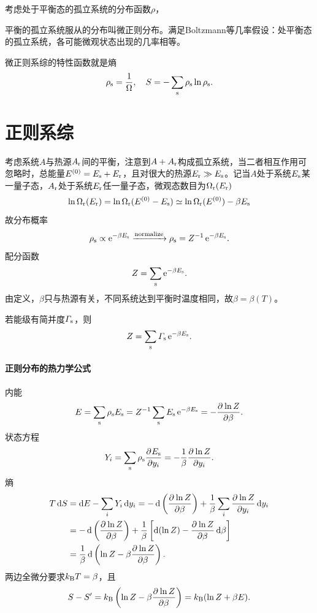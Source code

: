 考虑处于平衡态的孤立系统的分布函数$\rho$，

平衡的孤立系统服从的分布叫微正则分布。满足Boltzmann等几率假设：处平衡态的孤立系统，各可能微观状态出现的几率相等。

微正则系综的特性函数就是熵
\[
	\rho_\mathrm s=\frac1\Omega,\quad S=-\sum_\mathrm s\rho_\mathrm s\ln\rho_\mathrm s.
\]

\section{正则系综}

考虑系统$A$与热源$A_\mathrm r$间的平衡，注意到$A+A_\mathrm r$构成孤立系统，当二者相互作用可忽略时，总能量$E^{(0)}=E_\mathrm s+E_\mathrm r$，且对很大的热源$E_\mathrm r\gg E_\mathrm s$。记当$A$处于系统$E_\mathrm s$某一量子态，$A_\mathrm r$处于系统$E_\mathrm r$任一量子态，微观态数目为$\Omega_\mathrm r(E_\mathrm r)$
\[
	\ln\Omega_\mathrm r(E_\mathrm r)=\ln\Omega_\mathrm r(E^{(0)}-E_\mathrm s)\simeq\ln\Omega_\mathrm r(E^{(0)})-\beta E_\mathrm s
\]
故分布概率
\[
	\rho_\mathrm s\propto\mathop{}\!\mathrm{e}^{-\beta E_\mathrm s}\xrightarrow{\text{normalize}}\rho_\mathrm s=Z^{-1}\mathop{}\!\mathrm{e}^{-\beta E_\mathrm s}.
\]
配分函数
\[
	Z=\sum_\mathrm s\mathop{}\!\mathrm{e}^{-\beta E_\mathrm s}.
\]
由定义，$\beta$只与热源有关，不同系统达到平衡时温度相同，故$\beta=\beta(T)$。

若能级有简并度$\varGamma_\mathrm s$，则 
\begin{align}
	Z=\sum_\mathrm s\varGamma_\mathrm s\mathop{}\!\mathrm{e}^{-\beta E_\mathrm s}.
\end{align}
\paragraph{正则分布的热力学公式}内能
\begin{align}
	E=\sum_\mathrm s\rho_\mathrm s E_\mathrm s=Z^{-1}\sum_\mathrm s E_\mathrm s\mathop{}\!\mathrm{e}^{-\beta E_\mathrm s}=-\frac{\partial^{{}}\ln Z}{\partial{\beta}^{{}}}.
\end{align}
状态方程
\begin{align}
	Y_i=\sum_\mathrm s\rho_\mathrm s\frac{\partial^{{}}E_\mathrm s}{\partial{y_i}^{{}}}=-\frac1\beta\frac{\partial^{{}}\ln Z}{\partial{y_i}^{{}}}.
\end{align}
熵
\begin{align*}
	T\d S&=\d E-\sum_i Y_i\d y_i=-\d\kh{\pv{\ln Z}\beta}+\frac1\beta\sum_i\pv{\ln Z}{y_i}\d y_i\\
	&=-\d\kh{\pv{\ln Z}\beta}+\frac1\beta\fkh{\d(\ln Z)-\pv{\ln Z}\beta\d\beta}\\
	&=\frac1\beta\d\kh{\ln Z-\beta\pv{\ln Z}\beta}.
\end{align*}
两边全微分要求$k_{\mathrm B} T=\beta$，且 
\begin{align}
	S-S'=k_{\mathrm B}\left(\ln Z-\beta\frac{\partial^{{}}\ln Z}{\partial{\beta}^{{}}}\right)=k_{\mathrm B}(\ln Z+\beta E).
\end{align}

